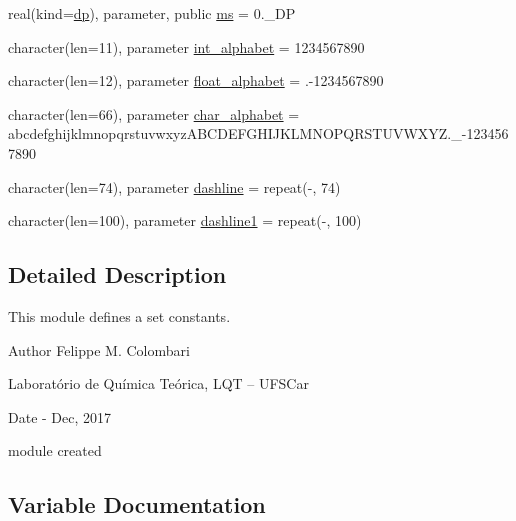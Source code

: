 \begin{DoxyCompactItemize}
real(kind=\hyperlink{namespacemod__constants_ac7aeda7f1802c4ef2a4780773c028214}{dp}), parameter, public \hyperlink{namespacemod__constants_ab31d074fb8a49a9991d7d6e3d4904d59}{ms} = 0.\+\_\+\+DP
\item 
character(len=11), parameter \hyperlink{namespacemod__constants_a41cb897f7d31e58ab3c2b2f7ecf86983}{int\+\_\+alphabet} = \textquotesingle{}1234567890\textquotesingle{}
\item 
character(len=12), parameter \hyperlink{namespacemod__constants_a4b168363a34adf3e1236769aa1ec0fed}{float\+\_\+alphabet} = \textquotesingle{}.-\/1234567890\textquotesingle{}
\item 
character(len=66), parameter \hyperlink{namespacemod__constants_a1d9e53f57f87f727d4dd13f1dd4b8e45}{char\+\_\+alphabet} = \textquotesingle{}abcdefghijklmnopqrstuvwxyz\+A\+B\+C\+D\+E\+F\+G\+H\+I\+J\+K\+L\+M\+N\+O\+P\+Q\+R\+S\+T\+U\+V\+W\+X\+Y\+Z.\+\_\+-\/1234567890 \textquotesingle{}
\item 
character(len=74), parameter \hyperlink{namespacemod__constants_ab55dac3c52ff6b1034697c6e83ac76d8}{dashline} = repeat(\textquotesingle{}-\/\textquotesingle{}, 74)
\item 
character(len=100), parameter \hyperlink{namespacemod__constants_ad292a8f1897875585bad7d5f454cf64a}{dashline1} = repeat(\textquotesingle{}-\/\textquotesingle{}, 100)
\end{DoxyCompactItemize}


\subsection{Detailed Description}
This module defines a set constants. 

\begin{DoxyAuthor}{Author}
Felippe M. Colombari
\begin{DoxyItemize}
\item Laboratório de Química Teórica, L\+QT -- U\+F\+S\+Car 
\end{DoxyItemize}
\end{DoxyAuthor}
\begin{DoxyDate}{Date}
-\/ Dec, 2017
\begin{DoxyItemize}
\item module created 
\end{DoxyItemize}
\end{DoxyDate}


\subsection{Variable Documentation}
\mbox{\label{namespacemod__constants_a0943b8c8fb52658fb3d4370e5defb34b}} 
